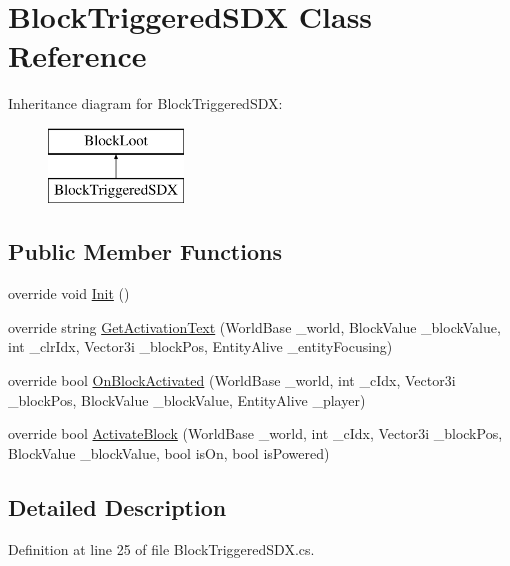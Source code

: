 \hypertarget{class_block_triggered_s_d_x}{}\section{Block\+Triggered\+S\+DX Class Reference}
\label{class_block_triggered_s_d_x}
Inheritance diagram for Block\+Triggered\+S\+DX\+:\begin{figure}[H]
\begin{center}
\leavevmode
\includegraphics[height=2.000000cm]{class_block_triggered_s_d_x}
\end{center}
\end{figure}
\subsection*{Public Member Functions}
\begin{DoxyCompactItemize}
\item 
override void \mbox{\hyperlink{class_block_triggered_s_d_x_ab1f3e6b06186cba913e076dafc6b4624}{Init}} ()
\item 
override string \mbox{\hyperlink{class_block_triggered_s_d_x_ae8a8c155a8354cc445344d3d35d4cc96}{Get\+Activation\+Text}} (World\+Base \+\_\+world, Block\+Value \+\_\+block\+Value, int \+\_\+clr\+Idx, Vector3i \+\_\+block\+Pos, Entity\+Alive \+\_\+entity\+Focusing)
\item 
override bool \mbox{\hyperlink{class_block_triggered_s_d_x_ab8f68218bbac30a74c3d2c83ea017b44}{On\+Block\+Activated}} (World\+Base \+\_\+world, int \+\_\+c\+Idx, Vector3i \+\_\+block\+Pos, Block\+Value \+\_\+block\+Value, Entity\+Alive \+\_\+player)
\item 
override bool \mbox{\hyperlink{class_block_triggered_s_d_x_a37ee60834670abd0fbe2efe39da887a0}{Activate\+Block}} (World\+Base \+\_\+world, int \+\_\+c\+Idx, Vector3i \+\_\+block\+Pos, Block\+Value \+\_\+block\+Value, bool is\+On, bool is\+Powered)
\end{DoxyCompactItemize}


\subsection{Detailed Description}


Definition at line 25 of file Block\+Triggered\+S\+D\+X.\+cs.



